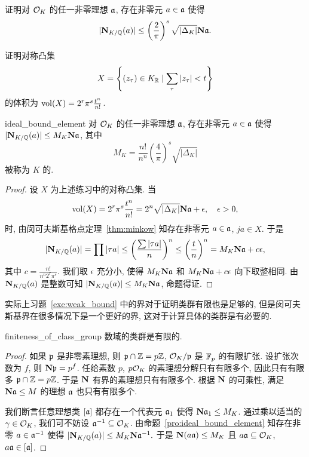 \begin{exercise}\label{exe:weak_bound}
证明对 ${\mathcal{O}}_K$ 的任一非零理想 ${\mathfrak{a}}$, 存在非零元 $a\in{\mathfrak{a}}$ 使得
  \[|{\mathbf{N}}_{K/{\mathbb{Q}}}(a)|\le \left(\frac{2}{\pi}\right)^s\sqrt{|\Delta_K|}{\mathbf{N}}{\mathfrak{a}}.\]
\end{exercise}

\begin{exercise}
证明对称凸集
  \[X=\left\{(z_\tau)\in K_{\mathbb{R}}\mid \sum\limits_\tau |z_\tau|<t\right\}\]
的体积为 ${\mathrm{vol}}(X)=2^r\pi^s \frac{t^n}{n!}$.
\end{exercise}

\begin{proposition}{}{ideal_bound_element}
对 ${\mathcal{O}}_K$ 的任一非零理想 ${\mathfrak{a}}$, 存在非零元 $a\in{\mathfrak{a}}$ 使得
$|{\mathbf{N}}_{K/{\mathbb{Q}}}(a)|\le M_K{\mathbf{N}}{\mathfrak{a}}$, 其中
  \[M_K=\frac{n!}{n^n} \left(\frac{4}{\pi}\right)^s \sqrt{|\Delta_K|}\]
被称为 $K$ 的.
\end{proposition}
\begin{proof}
设 $X$ 为上述练习中的对称凸集. 当
  \[{\mathrm{vol}}(X)=2^r\pi^s\frac{t^n}{n!}=2^n\sqrt{|\Delta_K|}{\mathbf{N}}{\mathfrak{a}}+\epsilon,\quad \epsilon>0,\]
时, 由闵可夫斯基格点定理~\ref{thm:minkow} 知存在非零元 $a\in{\mathfrak{a}}$, $ja\in X$. 于是
  \[|{\mathbf{N}}_{K/{\mathbb{Q}}}(a)|=\prod|\tau a|\le\left(\frac{\sum|\tau a|}{n}\right)^n\le\left(\frac{t}{n}\right)^n=M_K{\mathbf{N}}{\mathfrak{a}}+c\epsilon,\]
其中 $c=\frac{n!}{n^n 2^r\pi^s}$.
我们取 $\epsilon$ 充分小, 使得 $M_K{\mathbf{N}}{\mathfrak{a}}$ 和 $M_K{\mathbf{N}}{\mathfrak{a}}+c\epsilon$ 向下取整相同. 由 ${\mathbf{N}}_{K/{\mathbb{Q}}}(a)$ 是整数可知 $|{\mathbf{N}}_{K/{\mathbb{Q}}}(a)|\le M_K{\mathbf{N}}{\mathfrak{a}}$, 命题得证.
\end{proof}

\begin{remark}
实际上习题~\ref{exe:weak_bound} 中的界对于证明类群有限也是足够的, 但是闵可夫斯基界在很多情况下是一个更好的界, 这对于计算具体的类群是有必要的.
\end{remark}

\begin{theorem}{}{finiteness_of_class_group}
数域的类群是有限的.
\end{theorem}
\begin{proof}
如果 ${\mathfrak{p}}$ 是非零素理想, 则 ${\mathfrak{p}}\cap {\mathbb{Z}}=p{\mathbb{Z}}$, ${\mathcal{O}}_K/{\mathfrak{p}}$ 是 ${\mathbb{F}}_p$ 的有限扩张. 设扩张次数为 $f$, 则 ${\mathbf{N}}{\mathfrak{p}}=p^f$. 任给素数 $p$, $p{\mathcal{O}}_K$ 的素理想分解只有有限多个, 因此只有有限多 ${\mathfrak{p}}\cap {\mathbb{Z}}=p{\mathbb{Z}}$. 于是 ${\mathbf{N}}$ 有界的素理想只有有限多个. 根据 ${\mathbf{N}}$ 的可乘性, 满足 ${\mathbf{N}}{\mathfrak{a}}\le M$ 的理想 ${\mathfrak{a}}$ 也只有有限多个.

我们断言任意理想类 $[{\mathfrak{a}}]$ 都存在一个代表元 ${\mathfrak{a}}_1$ 使得 ${\mathbf{N}}{\mathfrak{a}}_1\le M_K$.
通过乘以适当的 $\gamma\in{\mathcal{O}}_K$, 我们可不妨设 ${\mathfrak{a}}^{-1}\subseteq {\mathcal{O}}_K$. 由命题~\ref{pro:ideal_bound_element} 知存在非零 $a\in{\mathfrak{a}}^{-1}$ 使得 $|{\mathbf{N}}_{K/{\mathbb{Q}}}(a)|\le M_K{\mathbf{N}}{\mathfrak{a}}^{-1}.$
于是 ${\mathbf{N}}(a{\mathfrak{a}})\le M_K$ 且 $a{\mathfrak{a}}\subseteq {\mathcal{O}}_K$, $a{\mathfrak{a}}\in[{\mathfrak{a}}]$.
\end{proof}


